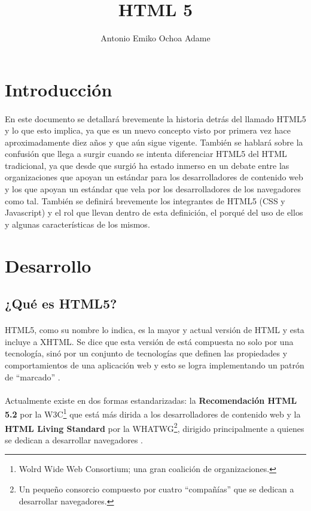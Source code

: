 \documentclass{article}
\begin{document}
\title{HTML 5}
\author{Antonio Emiko Ochoa Adame}
\maketitle

\tableofcontents

\section{Introducción}

\paragraph{}
En este documento se detallará brevemente la historia detrás del llamado HTML5
y lo que esto implica, ya que es un nuevo concepto visto por primera vez hace
aproximadamente diez años y que aún sigue vigente. También se hablará sobre la
confusión que llega a surgir cuando se intenta diferenciar HTML5 del HTML
tradicional, ya que desde que surgió ha estado inmerso en un debate entre las
organizaciones que apoyan un estándar para los desarrolladores de contenido web y los que
apoyan un estándar que vela por los desarrolladores de los navegadores como tal.
También se definirá brevemente los integrantes de HTML5 (CSS y Javascript) y el
rol que llevan dentro de esta definición, el porqué del uso de ellos y algunas
características de los mismos.

\section{Desarrollo}

\subsection{¿Qué es HTML5?}

\paragraph{}
HTML5, como su nombre lo indica, es la mayor y actual versión de HTML y esta
incluye a XHTML. Se dice que esta versión de está compuesta no solo por una
tecnología, sinó por un conjunto de tecnologías que definen las propiedades y
comportamientos de una aplicación web y esto se logra implementando un patrón
de ``marcado'' \cite{wiki_html5}.

\paragraph{}
Actualmente existe en dos formas estandarizadas: la \textbf{Recomendación HTML 5.2} por
la W3C\footnote{Wolrd Wide Web Consortium; una gran coalición de organizaciones.}
que está más dirida a los desarrolladores de contenido web y la
\textbf{HTML Living Standard} por la WHATWG\footnote{Un pequeño consorcio
compuesto por cuatro ``compañías'' que se dedican a desarrollar navegadores.},
dirigido principalmente a quienes se dedican a desarrollar navegadores
\cite{wiki_html5}.
\end{document}
